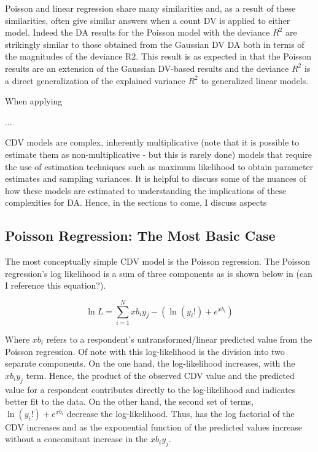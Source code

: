 \documentclass[ShortAfour,times,sageapa]{sagej}
\begin{document}
	
	
	Poisson and linear regression share many similarities and, as a result of these similarities, often give similar answers when a count DV is applied to either model.
	Indeed the DA results for the Poisson model with the deviance $R^2$ are strikingly similar to those obtained from the Gaussian DV DA both in terms of the magnitudes of the deviance R2.  
	This result is as expected in that the Poisson results are an extension of the Gaussian DV-based results and the deviance $R^2$ is a direct generalization of the explained variance $R^2$ to generalized linear models.
	
	When applying
	
	...
	
	
	CDV models are complex, inherently multiplicative (note that it is possible to estimate them as non-multiplicative - but this is rarely done) models that require the use of estimation techniques such as maximum likelihood to obtain parameter estimates and sampling variances.
	It is helpful to discuss some of the nuances of how these models are estimated to understanding the implications of these complexities for DA.
	Hence, in the sections to come, I discuss aspects 

	\subsection{Poisson Regression: The Most Basic Case}
	
	The most conceptually simple CDV model is the Poisson regression.  
	The Poisson regression's log likelihood is a sum of three components as is shown below in (can I reference this equation?).
	
	\begin{equation}
		\ln L = \sum_{i=1}^{N} xb_{i}y_{j} - (\ln (y_{i}!) + e^{xb_{i}})
	\end{equation}

	Where $xb_{i}$ refers to a respondent's untransformed/linear predicted value from the Poisson regression.  
	Of note with this log-likelihood is the division into two separate components.  
	On the one hand, the log-likelihood increases, with the $xb_{i}y_{j}$ term.  
	Hence, the product of the observed CDV value and the predicted value for a respondent contributes directly to the log-likelihood and indicates better fit to the data.
	On the other hand, the second set of terms, $\ln (y_{i}!) + e^{xb_{i}}$ decrease the log-likelihood.  
	Thus, has the log factorial of the CDV increases and as the exponential function of the predicted values increase without a concomitant increase in the $xb_{i}y_{j}$.
	
\end{document}
